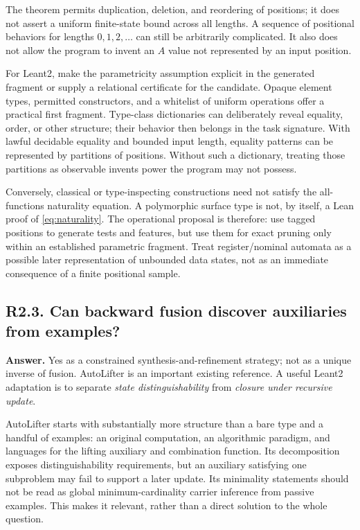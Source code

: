 \documentclass[11pt,a4paper]{article}
\newcommand{\question}[2]{\subsection{#1. #2}\label{q:#1}}
\theoremstyle{definition}
\theoremstyle{remark}
\begin{document}
The theorem permits duplication, deletion, and reordering of positions; it does not assert a uniform finite-state bound across all lengths. A sequence of positional behaviors for lengths $0,1,2,\ldots$ can still be arbitrarily complicated. It also does not allow the program to invent an $A$ value not represented by an input position.

For Leant2, make the parametricity assumption explicit in the generated fragment or supply a relational certificate for the candidate. Opaque element types, permitted constructors, and a whitelist of uniform operations offer a practical first fragment. Type-class dictionaries can deliberately reveal equality, order, or other structure; their behavior then belongs in the task signature. With lawful decidable equality and bounded input length, equality patterns can be represented by partitions of positions. Without such a dictionary, treating those partitions as observable invents power the program may not possess.

Conversely, classical or type-inspecting constructions need not satisfy the all-functions naturality equation. A polymorphic surface type is not, by itself, a Lean proof of \eqref{eq:naturality}. The operational proposal is therefore: use tagged positions to generate tests and features, but use them for exact pruning only within an established parametric fragment. Treat register/nominal automata as a possible later representation of unbounded data states, not as an immediate consequence of a finite positional sample.

\question{R2.3}{Can backward fusion discover auxiliaries from examples?}

\textbf{Answer.} Yes as a constrained synthesis-and-refinement strategy; not as a unique inverse of fusion. AutoLifter is an important existing reference. A useful Leant2 adaptation is to separate \emph{state distinguishability} from \emph{closure under recursive update}.

AutoLifter starts with substantially more structure than a bare type and a handful of examples: an original computation, an algorithmic paradigm, and languages for the lifting auxiliary and combination function. Its decomposition exposes distinguishability requirements, but an auxiliary satisfying one subproblem may fail to support a later update. Its minimality statements should not be read as global minimum-cardinality carrier inference from passive examples.\cite{autolifter} This makes it relevant, rather than a direct solution to the whole question.
\end{document}
